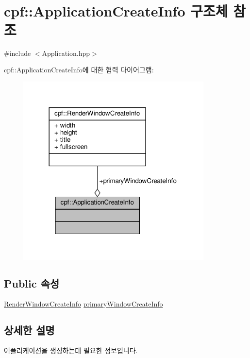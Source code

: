 \hypertarget{structcpf_1_1_application_create_info}{}\section{cpf\+:\+:Application\+Create\+Info 구조체 참조}
\label{structcpf_1_1_application_create_info}


{\ttfamily \#include $<$Application.\+hpp$>$}



cpf\+:\+:Application\+Create\+Info에 대한 협력 다이어그램\+:
\nopagebreak
\begin{figure}[H]
\begin{center}
\leavevmode
\includegraphics[width=278pt]{structcpf_1_1_application_create_info__coll__graph}
\end{center}
\end{figure}
\subsection*{Public 속성}
\begin{DoxyCompactItemize}
\item 
\hyperlink{structcpf_1_1_render_window_create_info}{Render\+Window\+Create\+Info} \hyperlink{structcpf_1_1_application_create_info_a1cd605f921ac5ac29474cbe52f7ea499}{primary\+Window\+Create\+Info}
\end{DoxyCompactItemize}


\subsection{상세한 설명}
어플리케이션을 생성하는데 필요한 정보입니다. 

